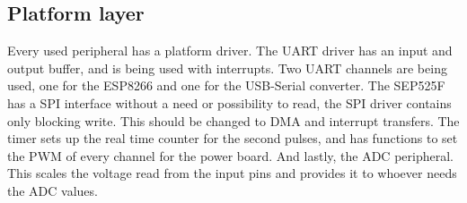 \subsection{Platform layer}

Every used peripheral has a platform driver. The UART driver has an input and output buffer, and is being used with interrupts. Two UART channels are being used, one for the ESP8266 and one for the USB-Serial converter. The SEP525F has a SPI interface without a need or possibility to read, the SPI driver contains only blocking write. This should be changed to DMA and interrupt transfers. The timer sets up the real time counter for the second pulses, and has functions to set the PWM of every channel for the power board. And lastly, the ADC peripheral. This scales the voltage read from the input pins and provides it to whoever needs the ADC values.
